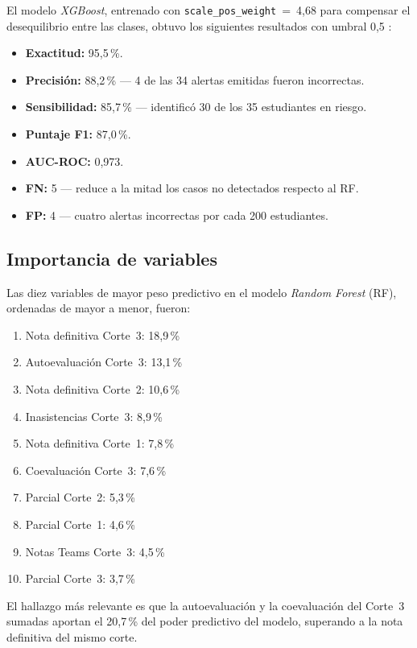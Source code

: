 \documentclass[12pt,letterpaper]{article}
\newcommand{\RF}{\textit{Random Forest} (RF)\xspace}
\newcommand{\XGB}{\textit{XGBoost}\xspace}
\begin{document}
El modelo \XGB, entrenado con \texttt{scale\_pos\_weight}~=~4,68 para compensar el desequilibrio entre las clases, obtuvo los siguientes resultados con umbral 0,5 \parencite{chen2016}:

\begin{itemize}
  \item \textbf{Exactitud:} 95,5\,\%.
  \item \textbf{Precisión:} 88,2\,\% — 4 de las 34 alertas emitidas fueron incorrectas.
  \item \textbf{Sensibilidad:} 85,7\,\% — identificó 30 de los 35 estudiantes en riesgo.
  \item \textbf{Puntaje F1:} 87,0\,\%.
  \item \textbf{AUC-ROC:} 0,973.
  \item \textbf{FN:} 5 — reduce a la mitad los casos no detectados respecto al RF.
  \item \textbf{FP:} 4 — cuatro alertas incorrectas por cada 200 estudiantes.
\end{itemize}

\subsection{Importancia de variables}

Las diez variables de mayor peso predictivo en el modelo \RF, ordenadas de mayor a menor, fueron:

\begin{enumerate}
  \item Nota definitiva Corte~3: 18,9\,\%
  \item Autoevaluación Corte~3: 13,1\,\%
  \item Nota definitiva Corte~2: 10,6\,\%
  \item Inasistencias Corte~3: 8,9\,\%
  \item Nota definitiva Corte~1: 7,8\,\%
  \item Coevaluación Corte~3: 7,6\,\%
  \item Parcial Corte~2: 5,3\,\%
  \item Parcial Corte~1: 4,6\,\%
  \item Notas Teams Corte~3: 4,5\,\%
  \item Parcial Corte~3: 3,7\,\%
\end{enumerate}

El hallazgo más relevante es que la autoevaluación y la coevaluación del Corte~3 sumadas aportan el 20,7\,\% del poder predictivo del modelo, superando a la nota definitiva del mismo corte.
\end{document}
